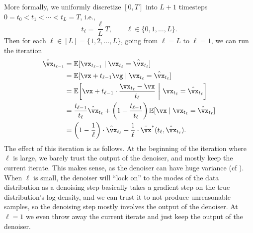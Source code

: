 \documentclass[../../book-main.tex]{subfiles}
\begin{document}
More formally, we uniformly discretize \([0, T]\) into \(L + 1\) timesteps \(0 = t_{0} < t_{1} < \cdots < t_{L} = T\), i.e.,
\begin{equation}
	t_{\ell} = \frac{\ell}{L}T, \qquad \ell \in \{0, 1, \dots, L\}.
\end{equation}
Then for each \(\ell \in [L] = \{1, 2, \dots, L\}\), going from \(\ell = L\) to \(\ell = 1\), we can run the iteration
\begin{align}
	\hat{\vx}_{t_{\ell - 1}}
	&= \Ex[\vx_{t_{\ell - 1}} \mid \vx_{t_{\ell}} = \hat{\vx}_{t_{\ell}}] \\
	&= \Ex[\vx + t_{\ell - 1}\vg \mid \vx_{t_{\ell}} = \hat{\vx}_{t_{\ell}}] \\
	&= \Ex\rs{\vx + t_{\ell - 1}\cdot\frac{\vx_{t_{\ell}} - \vx}{t_{\ell}} \given \vx_{t_{\ell}} = \hat{\vx}_{t_{\ell}}} \\
	&= \frac{t_{\ell - 1}}{t_{\ell}}\hat{\vx}_{t_{\ell}} + \bp{1 - \frac{t_{\ell - 1}}{t_{\ell}}}\Ex[\vx \mid \vx_{t_{\ell}} = \hat{\vx}_{t_{\ell}}] \\
	&= \bp{1 - \frac{1}{\ell}}\cdot\hat{\vx}_{t_{\ell}} + \frac{1}{\ell}\cdot\bar{\vx}^{\ast}(t_{\ell}, \hat{\vx}_{t_{\ell}}).
\end{align}
The effect of this iteration is as follows. At the beginning of the iteration where \(\ell\) is large, we barely trust the output of the denoiser, and mostly keep the current iterate. This makes sense, as the denoiser can have huge variance (cf ). When \(\ell\) is small, the denoiser will ``lock on'' to the modes of the data distribution as a denoising step basically takes a gradient step on the true distribution's log-density, and we can trust it to not produce unreasonable samples, so the denoising step mostly involves the output of the denoiser. At \(\ell = 1\) we even throw away the current iterate and just keep the output of the denoiser.
\end{document}
